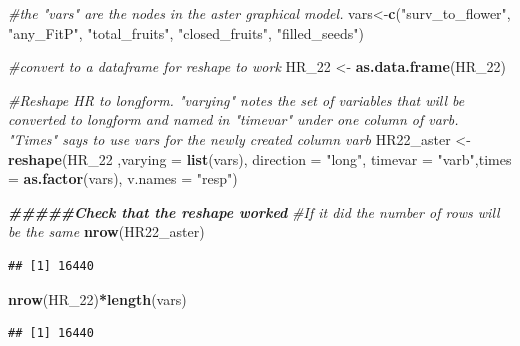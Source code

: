 \documentclass[
]{article}
\newenvironment{Shaded}{\begin{snugshade}}{\end{snugshade}}
\newcommand{\AttributeTok}[1]{\textcolor[rgb]{0.13,0.29,0.53}{#1}}
\newcommand{\CommentTok}[1]{\textcolor[rgb]{0.56,0.35,0.01}{\textit{#1}}}
\newcommand{\DocumentationTok}[1]{\textcolor[rgb]{0.56,0.35,0.01}{\textbf{\textit{#1}}}}
\newcommand{\FunctionTok}[1]{\textcolor[rgb]{0.13,0.29,0.53}{\textbf{#1}}}
\newcommand{\NormalTok}[1]{#1}
\newcommand{\OtherTok}[1]{\textcolor[rgb]{0.56,0.35,0.01}{#1}}
\newcommand{\SpecialCharTok}[1]{\textcolor[rgb]{0.81,0.36,0.00}{\textbf{#1}}}
\newcommand{\StringTok}[1]{\textcolor[rgb]{0.31,0.60,0.02}{#1}}
\begin{document}
\begin{Shaded}
\begin{Highlighting}[]
\CommentTok{\#the "vars" are the nodes in the aster graphical model.   }
\NormalTok{vars}\OtherTok{\textless{}{-}}\FunctionTok{c}\NormalTok{(}\StringTok{"surv\_to\_flower"}\NormalTok{, }\StringTok{"any\_FitP"}\NormalTok{, }\StringTok{"total\_fruits"}\NormalTok{, }\StringTok{"closed\_fruits"}\NormalTok{, }\StringTok{"filled\_seeds"}\NormalTok{)}

\CommentTok{\#convert to a dataframe for reshape to work}
\NormalTok{HR\_22 }\OtherTok{\textless{}{-}} \FunctionTok{as.data.frame}\NormalTok{(HR\_22)}

\CommentTok{\#Reshape HR to longform. "varying" notes the set of variables that will be converted to longform and named in "timevar" under one column of varb. "Times" says to use vars for the newly created column varb }
\NormalTok{HR22\_aster }\OtherTok{\textless{}{-}} \FunctionTok{reshape}\NormalTok{(HR\_22 ,}\AttributeTok{varying =} \FunctionTok{list}\NormalTok{(vars), }\AttributeTok{direction =} \StringTok{"long"}\NormalTok{, }\AttributeTok{timevar =} \StringTok{"varb"}\NormalTok{,}\AttributeTok{times =} \FunctionTok{as.factor}\NormalTok{(vars), }\AttributeTok{v.names =} \StringTok{"resp"}\NormalTok{)}

\DocumentationTok{\#\#\#\#\#Check that the reshape worked }
\CommentTok{\#If it did the number of rows will be the same }
\FunctionTok{nrow}\NormalTok{(HR22\_aster)}
\end{Highlighting}
\end{Shaded}

\begin{verbatim}
## [1] 16440
\end{verbatim}

\begin{Shaded}
\begin{Highlighting}[]
\FunctionTok{nrow}\NormalTok{(HR\_22)}\SpecialCharTok{*}\FunctionTok{length}\NormalTok{(vars)}
\end{Highlighting}
\end{Shaded}

\begin{verbatim}
## [1] 16440
\end{verbatim}
\end{document}
